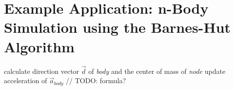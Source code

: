 \section{Example Application: n-Body Simulation using the Barnes-Hut Algorithm}

\cite{thuring_comparing_2023}

\begin{algorithm}
    \begin{algorithmic}[1]
            \State calculate direction vector $\vec{d}$ of \textit{body} and the center of mass of \textit{node}
                \State update acceleration of $\vec{a}_{\textit{body}}$ // TODO: formula?
            \Else
                    \State {}
                \EndFor
            \EndIf
        \EndFunction
    \end{algorithmic}
    \label{alg:acc_bh}
    \caption{Function for updating the acceleration using the Barnes-Hut algorithm.}
\end{algorithm}
